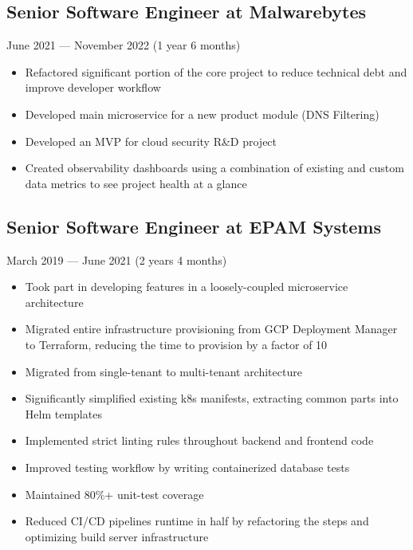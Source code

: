 \documentclass[a4paper,11pt]{article}
\begin{document}
\subsection{Senior Software Engineer at Malwarebytes}
June 2021 --- November 2022 (1 year 6 months)
\begin{itemize}[noitemsep]
    \renewcommand{\labelitemi}{---}

    \item Refactored significant portion of the core project to reduce technical debt and improve developer workflow
    \item Developed main microservice for a new product module (DNS Filtering)
    \item Developed an MVP for cloud security R\&D project
    \item Created observability dashboards using a combination of existing and custom data metrics to see project health at a glance
\end{itemize}

\subsection{Senior Software Engineer at EPAM Systems}
March 2019 --- June 2021 (2 years 4 months)
\begin{itemize}[noitemsep]
    \renewcommand{\labelitemi}{---}

    \item Took part in developing features in a loosely-coupled microservice architecture
    \item Migrated entire infrastructure provisioning from GCP Deployment Manager to Terraform, reducing the time to provision by a factor of 10
    \item Migrated from single-tenant to multi-tenant architecture
    \item Significantly simplified existing k8s manifests, extracting common parts into Helm templates
    \item Implemented strict linting rules throughout backend and frontend code
    \item Improved testing workflow by writing containerized database tests
    \item Maintained 80\%+ unit-test coverage
    \item Reduced CI/CD pipelines runtime in half by refactoring the steps and optimizing build server infrastructure
\end{itemize}
\end{document}
